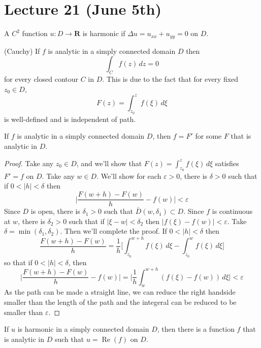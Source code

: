 \section{Lecture 21 (June 5th)}
\begin{recall}
A $C^2$ function $u:D\rightarrow {\bm R}$ is harmonic if $\Delta u=u_{xx}+u_{yy}=0$ on $D$. 
\end{recall}
\vspace{2ex}
\begin{recall}
(Cauchy) If $f$ is analytic in a simply connected domain $D$ then
\[\int _{C}f(z)\,dz=0\]
for every closed contour $C$ in $D$. This is due to the fact that for every fixed $z_0\in D$, 
\[F(z)=\int _{z_0}^{z}f(\xi )\,d\xi \]
is well-defined and is independent of path.
\end{recall}
\vspace{2ex}
\begin{thm}
If $f$ is analytic in a simply connected domain $D$, then $f=F'$ for some $F$ that is analytic in $D$. 
\end{thm}
\vspace{2ex}
\begin{proof}
Take any $z_0\in D$, and we'll show that $F(z)=\int ^{z}_{z_0}f(\xi )\,d\xi $ satisfies $F'=f$ on $D$. Take any $w\in D$. We'll show for each $\varepsilon >0$, there is $\delta >0$ such that if $0<|h|<\delta $ then 
\[\Big|\dfrac{F(w+h)-F(w)}{h}-f(w)\Big|<\varepsilon \]
Since $D$ is open, there is $\delta_1 >0$ such that $\bar{D}(w,\delta_1)\subset D$. Since $f$ is continuous at $w$, there is $\delta_2>0$ such that if $|\xi -w|<\delta_2$ then $|f(\xi )-f(w)|<\varepsilon$. Take $\delta =\mathop{\mathrm{min}}(\delta_1,\delta _2)$. Then we'll complete the proof. If $0<|h|<\delta $ then 
\[\dfrac{F(w+h)-F(w)}{h}=\dfrac{1}{h}\Big[\int ^{w+h}_{z_0}f(\xi )\,d\xi -\int ^{w}_{z_0}f(\xi )\,d\xi \Big]\]
so that if $0<|h|<\delta $, then
\[\Big|\dfrac{F(w+h)-F(w)}{h}-f(w)\Big|=\Big|\dfrac{1}{h}\int ^{w+h}_{w}(f(\xi )-f(w))\,d\xi \Big|<\varepsilon \]
As the path can be made a straight line, we can reduce the right handside smaller than the length of the path and the integeral can be reduced to be smaller than $\varepsilon $.
\end{proof}
\vspace{2ex}
\begin{thm}
If $u$ is harmonic in a simply connected domain $D$, then there is a function $f$ that is analytic in $D$ such that $u=\mathop{\mathrm{Re}}(f)$ on $D$. 
\end{thm}
\vspace{2ex}
